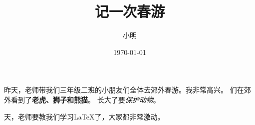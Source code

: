 \documentclass[a4paper]{article}
\author{小明}
\title{记一次春游}
\date{\today}
\begin{document}
  
\pagestyle{plain}  
\maketitle  

昨天，老师带我们三年级二班的小朋友们全体去郊外春游。我非常高兴。
们在郊外看到了\textbf{老虎、狮子和熊猫}。
长大了要\textsl{保护动物}。  

天，老师要教我们学习\LaTeX 了，大家都非常激动。  
\end{document}
